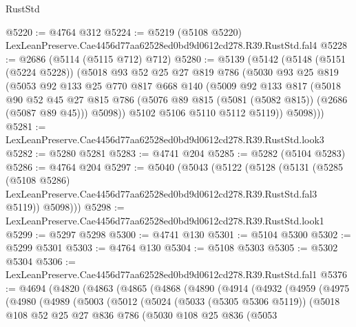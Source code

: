 \begin{lexlean}{RustStd}
\begin{coremodule}
@5220 := @4764 @312
@5224 := @5219 (@5108 @5220) LexLeanPreserve.Cae4456d77aa62528ed0bd9d0612cd278.R39.RustStd.fal4
@5228 := @2686 (@5114 (@5115 @712) @712)
@5280 := @5139
    (@5142
      (@5148
        (@5151 (@5224 @5228))
        (@5018
          @93
          @52
          @25
          @27
          @819
          @786
          (@5030
            @93
            @25
            @819
            (@5053
              @92
              @133
              @25
              @770
              @817
              @668
              @140
              (@5009
                @92
                @133
                @817
                (@5018
                  @90
                  @52
                  @45
                  @27
                  @815
                  @786
                  (@5076 @89 @815 (@5081 (@5082 @815)) (@2686 (@5087 @89 @45)))
                  @5098))
              @5102
              @5106
              @5110
              @5112
              @5119))
          @5098)))
@5281 := LexLeanPreserve.Cae4456d77aa62528ed0bd9d0612cd278.R39.RustStd.look3
@5282 := @5280 @5281
@5283 := @4741 @204
@5285 := @5282 (@5104 @5283)
@5286 := @4764 @204
@5297 := @5040
    (@5043
      (@5122
        (@5128
          (@5131
            (@5285
              (@5108 @5286)
              LexLeanPreserve.Cae4456d77aa62528ed0bd9d0612cd278.R39.RustStd.fal3
              @5119))
          @5098)))
@5298 := LexLeanPreserve.Cae4456d77aa62528ed0bd9d0612cd278.R39.RustStd.look1
@5299 := @5297 @5298
@5300 := @4741 @130
@5301 := @5104 @5300
@5302 := @5299 @5301
@5303 := @4764 @130
@5304 := @5108 @5303
@5305 := @5302 @5304
@5306 := LexLeanPreserve.Cae4456d77aa62528ed0bd9d0612cd278.R39.RustStd.fal1
@5376 := @4694
    (@4820
      (@4863
        (@4865
          (@4868
            (@4890
              (@4914
                (@4932
                  (@4959
                    (@4975
                      (@4980
                        (@4989
                          (@5003
                            (@5012
                              (@5024
                                (@5033 (@5305 @5306 @5119))
                                (@5018
                                  @108
                                  @52
                                  @25
                                  @27
                                  @836
                                  @786
                                  (@5030
                                    @108
                                    @25
                                    @836
                                    (@5053

\end{coremodule}
\end{lexlean}
